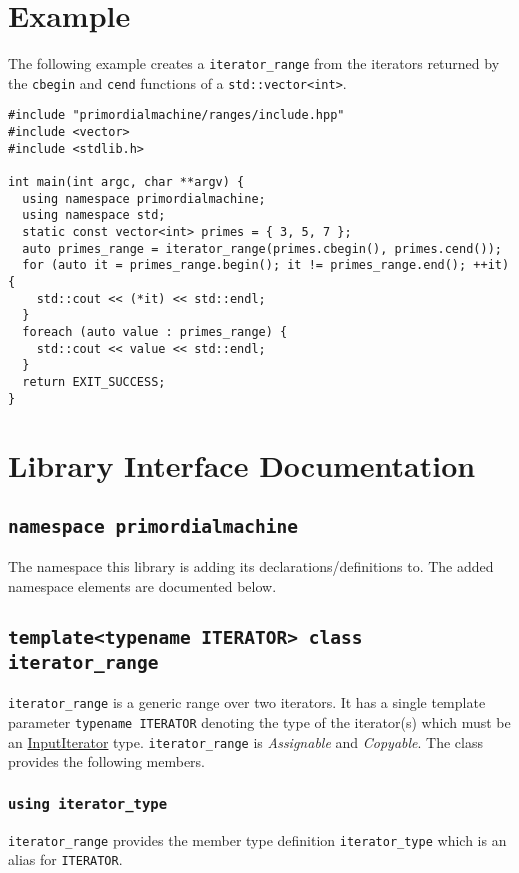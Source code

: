 \documentclass[oneside]{article}
\begin{document}
\section{Example}
The following example creates a \verb+iterator_range+ from the iterators returned by the
\verb+cbegin+ and \verb+cend+ functions of a \verb+std::vector<int>+.
\begin{verbatim}
#include "primordialmachine/ranges/include.hpp"
#include <vector>
#include <stdlib.h>

int main(int argc, char **argv) {
  using namespace primordialmachine;
  using namespace std;
  static const vector<int> primes = { 3, 5, 7 };
  auto primes_range = iterator_range(primes.cbegin(), primes.cend());
  for (auto it = primes_range.begin(); it != primes_range.end(); ++it) {
	std::cout << (*it) << std::endl;
  }
  foreach (auto value : primes_range) {
    std::cout << value << std::endl;
  }
  return EXIT_SUCCESS;
}
\end{verbatim}


\section{Library Interface Documentation}

\subsection{\texttt{namespace primordialmachine}}
The namespace this library is adding its declarations/definitions to.
The added namespace elements are documented below.

\subsection{\texttt{template<typename ITERATOR> class iterator\_range}}
\texttt{iterator\_range} is a generic range over two iterators.
It has a single template parameter \texttt{typename ITERATOR} denoting the type of the     iterator(s)
which must be an \href{https://en.cppreference.com/w/cpp/named_req/InputIterator}{InputIterator} type.
\texttt{iterator\_range} is \textit{Assignable} and \textit{Copyable}. The class provides         the
following members.

\subsubsection{\texttt{using iterator\_type}}
\texttt{iterator\_range} provides the member type definition \texttt{iterator\_type} which is an alias
for \texttt{ITERATOR}.
\end{document}
